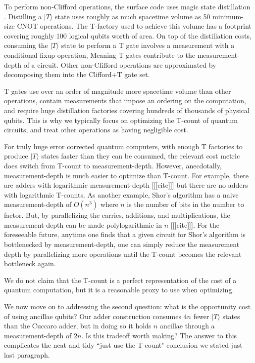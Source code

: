 \documentclass[twocolumn]{quantumarticle-customized}
\begin{document}
To perform non-Clifford operations, the surface code uses magic state distillation \cite{Fowler2012}.
Distilling a $|T\rangle$ state uses roughly as much spacetime volume as 50 minimum-size \textsc{CNOT} operations.
The T-factory used to achieve this volume has a footprint covering roughly 100 logical qubits worth of area.
On top of the distillation costs, consuming the $|T\rangle$ state to perform a T gate involves a measurement with a conditional fixup operation,
Meaning T gates contribute to the measurement-depth of a circuit.
Other non-Clifford operations are approximated by decomposing them into the Clifford+T gate set.

T gates use over an order of magnitude more spacetime volume than other operations, contain measurements that impose an ordering on the computation, and require huge distillation factories covering hundreds of thousands of physical qubits.
This is why we typically focus on optimizing the T-count of quantum circuits, and treat other operations as having negligible cost.

For truly huge error corrected quantum computers, with enough T factories to produce $|T\rangle$ states faster than they can be consumed, the relevant cost metric does switch from T-count to measurement-depth.
However, anecdotally, measurement-depth is much easier to optimize than T-count.
For example, there are adders with logarithmic measurement-depth [[[cite]]] but there are no adders with logarithmic T-counts.
As another example, Shor's algorithm has a naive measurement-depth of $O(n^3)$ where $n$ is the number of bits in the number to factor.
But, by parallelizing the carries, additions, and multiplications, the measurement-depth can be made polylogarithmic in $n$ [[[cite]]].
For the foreseeable future, anytime one finds that a given circuit for Shor's algorithm is bottlenecked by measurement-depth, one can simply reduce the measurement depth by parallelizing more operations until the T-count becomes the relevant bottleneck again.

We do not claim that the T-count is a perfect representation of the cost of a quantum computation, but it is a reasonable proxy to use when optimizing.

We now move on to addressing the second question: what is the opportunity cost of using ancillae qubits?
Our adder construction consumes $4n$ fewer $|T\rangle$ states than the Cuccaro adder, but in doing so it holds $n$ ancillae through a measurement-depth of $2n$.
Is this tradeoff worth making?
The answer to this complicates the neat and tidy ``just use the T-count" conclusion we stated just last paragraph.
\end{document}

